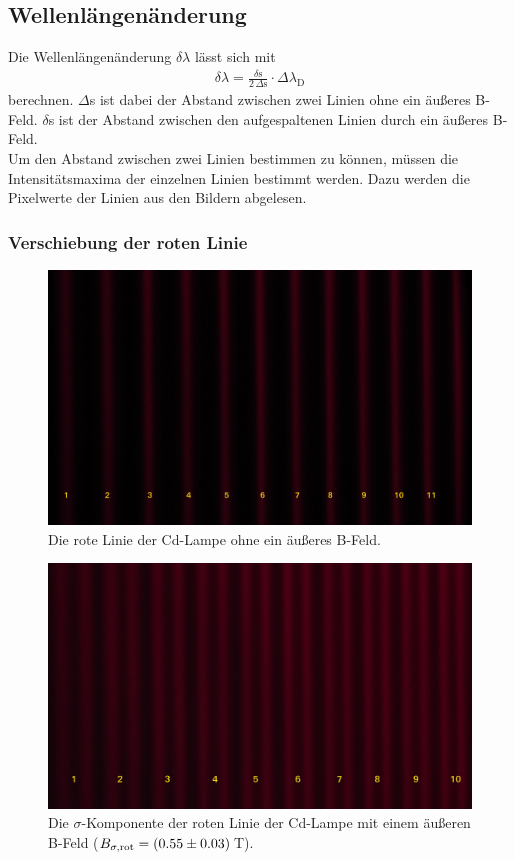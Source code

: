 \subsection{Wellenlängenänderung}
Die Wellenlängenänderung $\delta\lambda$ lässt sich mit
\begin{align}
  \delta\lambda = \frac{\delta\text{s}}{2\,\Delta\text{s}}\cdot \Delta\lambda_\text{D}
  \label{eqn:Verschiebung}
\end{align}
berechnen. $\Delta$s ist dabei der Abstand zwischen zwei Linien ohne ein äußeres B-Feld. $\delta$s ist der Abstand zwischen den aufgespaltenen Linien durch ein äußeres B-Feld. \\
Um den Abstand zwischen zwei Linien bestimmen zu können, müssen die Intensitätsmaxima der einzelnen Linien bestimmt werden. Dazu werden die Pixelwerte der Linien aus den Bildern abgelesen.



\subsubsection{Verschiebung der roten Linie}
\begin{figure}[H]
  \centering
  \includegraphics[width=0.8\linewidth]{Bilder/RoB.JPG}
  \caption{Die rote Linie der Cd-Lampe ohne ein äußeres B-Feld.}
  \label{fig:RoB}
\end{figure}

\begin{figure}[H]
  \centering
  \includegraphics[width=0.8\linewidth]{Bilder/R9ASig.JPG}
  \caption{Die $\sigma$-Komponente der roten Linie der Cd-Lampe mit einem äußeren B-Feld ($B_{\sigma,\text{rot}} = (\num{0.55 +- 0.03})$\,T).}
  \label{fig:R9ASig}
\end{figure}

